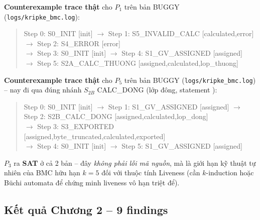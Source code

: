 \textbf{Counterexample trace thật} cho $P_1$ trên bản BUGGY (\texttt{logs/kripke\_bmc.log}):
\begin{quote}\ttfamily\footnotesize
Step 0: S0\_INIT [init] $\to$ Step 1: S5\_INVALID\_CALC [calculated,error] $\to$ Step 2: S4\_ERROR [error] \\
$\to$ Step 3: S0\_INIT [init] $\to$ Step 4: S1\_GV\_ASSIGNED [assigned] \\
$\to$ Step 5: S2A\_CALC\_THUONG [assigned,calculated,lop\_thuong]
\end{quote}

\textbf{Counterexample trace thật} cho $P_5$ trên bản BUGGY (\texttt{logs/kripke\_bmc.log}) -- nay đi qua đúng nhánh $S_{2B}$ CALC\_DONG (lớp đông, statement ):
\begin{quote}\ttfamily\footnotesize
Step 0: S0\_INIT [init] $\to$ Step 1: S1\_GV\_ASSIGNED [assigned] $\to$ Step 2: S2B\_CALC\_DONG [assigned,calculated,lop\_dong] \\
$\to$ Step 3: S3\_EXPORTED [assigned,byte\_truncated,calculated,exported] \\
$\to$ Step 4: S0\_INIT [init] $\to$ Step 5: S1\_GV\_ASSIGNED [assigned]
\end{quote}

$P_3$ ra \textbf{SAT} ở cả 2 bản -- đây \emph{không phải lỗi mã nguồn}, mà là giới hạn kỹ thuật tự nhiên của BMC hữu hạn $k=5$ đối với thuộc tính Liveness (cần $k$-induction hoặc Büchi automata để chứng minh liveness vô hạn triệt để).

\subsection{Kết quả Chương 2 -- 9 findings}

